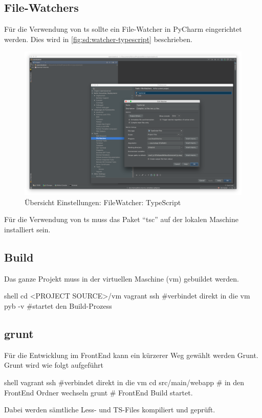 \subsection{File-Watchers}
Für die Verwendung von \ac{ts} sollte ein File-Watcher in PyCharm eingerichtet werden. Dies wird in \cref{fig:sd:watcher-typescript} beschrieben.
\begin{figure}[H]
	\centering
	\includegraphics[width=\linewidth]{fig/watcher_typescript}
	\caption{Übersicht Einstellungen: FileWatcher: TypeScript}
	\label{sd:watcher-typescript}
\end{figure}
Für die Verwendung von \ac{ts} muss das Paket ``tsc'' auf der lokalen Maschine installiert sein.

\subsection{Build}
Das ganze Projekt muss in der virtuellen Maschine (\acs{vm}) gebuildet werden. 
\begin{src}{shell}
cd <PROJECT SOURCE>/vm
vagrant ssh #verbindet direkt in die vm
pyb -v #startet den Build-Prozess
\end{src}
\subsection{grunt}
Für die Entwicklung im FrontEnd kann ein kürzerer Weg gewählt werden \textendash  Grunt.
Grunt wird wie folgt aufgeführt
\begin{src}{shell}
vagrant ssh #verbindet direkt in die vm
cd src/main/webapp # in den FrontEnd Ordner wechseln
grunt # FrontEnd Build startet.
\end{src}
Dabei werden sämtliche Less- und  TS-Files kompiliert und geprüft.
